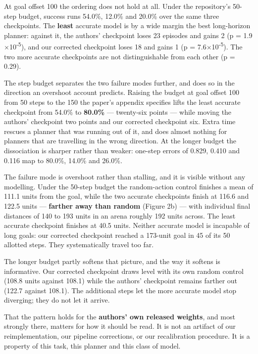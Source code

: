 \documentclass[10pt]{article}
\begin{document}
At goal offset 100 the ordering does not hold at all. Under the repository's
50-step budget, success runs 54.0\%, 12.0\% and 20.0\% over the same three
checkpoints. The \textbf{least} accurate model is by a wide margin the best
long-horizon planner: against it, the authors' checkpoint loses 23 episodes and
gains 2 (p = 1.9$\times$10\textsuperscript{-5}), and our corrected checkpoint loses 18 and gains 1
(p = 7.6$\times$10\textsuperscript{-5}). The two more accurate checkpoints are not distinguishable from
each other (p = 0.29).

The step budget separates the two failure modes further, and does so in the
direction an overshoot account predicts. Raising the budget at goal offset 100
from 50 steps to the 150 the paper's appendix specifies lifts the least accurate
checkpoint from 54.0\% to \textbf{80.0\%} --- twenty-six points --- while moving the
authors' checkpoint two points and our corrected checkpoint six. Extra time
rescues a planner that was running out of it, and does almost nothing for
planners that are travelling in the wrong direction. At the longer budget the
dissociation is sharper rather than weaker: one-step errors of 0.829, 0.410 and
0.116 map to 80.0\%, 14.0\% and 26.0\%.

The failure mode is overshoot rather than stalling, and it is visible without
any modelling. Under the 50-step budget the random-action control finishes a
mean of 111.1 units from the goal, while the two accurate checkpoints finish at 116.6 and 122.5 units --- \textbf{farther away than random} (Figure 2b) --- with individual final
distances of 140 to 193 units in an arena roughly 192 units across. The least
accurate checkpoint finishes at 40.5 units. Neither accurate model is incapable
of long goals: our corrected checkpoint reached a 173-unit goal in 45 of its 50
allotted steps. They systematically travel too far.

The longer budget partly softens that picture, and the way it softens is
informative. Our corrected checkpoint draws level with its own random control
(108.8 units against 108.1) while the authors' checkpoint remains farther out
(122.7 against 108.1). The additional steps let the more accurate model stop
diverging; they do not let it arrive.

That the pattern holds for the \textbf{authors' own released weights}, and most
strongly there, matters for how it should be read. It is not an artifact of our
reimplementation, our pipeline corrections, or our recalibration procedure. It
is a property of this task, this planner and this class of model.
\end{document}
